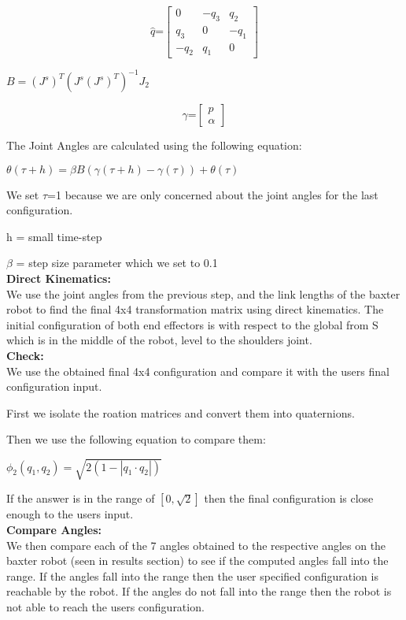 \documentclass[11pt]{article}
\begin{document}
$$
\text{$\hat{q}$=} \left[
\begin{array}{ccc}
0 & -q_3 & q_2  \\
q_3 & 0 & -q_1  \\
-q_2 & q_1 & 0
\end{array}
\right]
$$

$B = (J^s)^T(J^s(J^s)^T)^{-1}J_2$

$$
\text{$\gamma$=} \left[
\begin{array}{ccc}
p  \\
\alpha
\end{array}
\right] 
$$

The Joint Angles are calculated using the following equation:

$\theta(\tau+h) = \beta B (\gamma(\tau+h) - \gamma(\tau)) + \theta(\tau)$

We set $\tau$=1 because we are only concerned about the joint angles for the last configuration.

h = small time-step

$\beta$ = step size parameter which we set to 0.1
\\

{\bf Direct Kinematics:}
\\

We use the joint angles from the previous step, and the link lengths of the baxter robot to find the final 4x4 transformation matrix using direct kinematics. The initial configuration of both end effectors is with respect to the global from S which is in the middle of the robot, level to the shoulders joint.
\\

{\bf Check:}
\\

We use the obtained final 4x4 configuration and compare it with the users final configuration input.

First we isolate the roation matrices and convert them into quaternions.

Then we use the following equation to compare them:

$\phi_2(q_1,q_2) = \sqrt{2(1-|q_1 \cdot q_2|)}$ 

If the answer is in the range of $[0,\sqrt{2}]$ then the final configuration is close enough to the users input.
\\

{\bf Compare Angles:}
\\

We then compare each of the 7 angles obtained to the respective angles on the baxter robot (seen in results section) to see if the computed angles fall into the range. If the angles fall into the range then the user specified configuration is reachable by the robot. If the angles do not fall into the range then the robot is not able to reach the users configuration.
\end{document}
